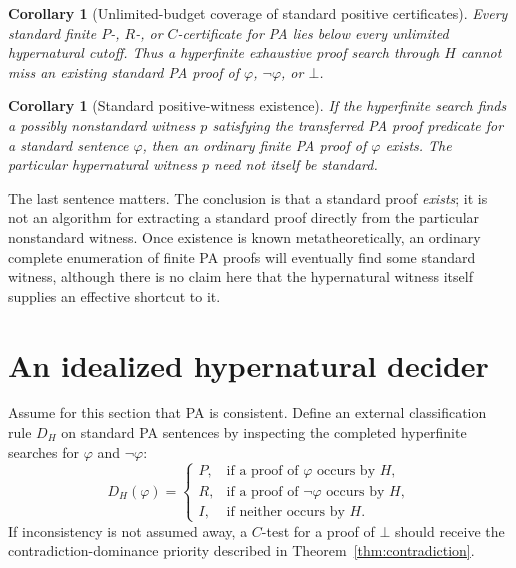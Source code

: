 \documentclass[11pt,openany]{book}
\newtheorem{corollary}[theorem]{Corollary}
\theoremstyle{definition}
\theoremstyle{remark}
\begin{document}
\begin{corollary}[Unlimited-budget coverage of standard positive certificates]\label{cor:hypercoverage}
Every standard finite $P$-, $R$-, or $C$-certificate for PA lies below every unlimited hypernatural cutoff. Thus a hyperfinite exhaustive proof search through $H$ cannot miss an existing standard PA proof of $\varphi$, $\neg\varphi$, or $\bot$.
\end{corollary}

\begin{corollary}[Standard positive-witness existence]\label{cor:positivehyperstandard}
If the hyperfinite search finds a possibly nonstandard witness $p$ satisfying the transferred PA proof predicate for a standard sentence $\varphi$, then an ordinary finite PA proof of $\varphi$ exists. The particular hypernatural witness $p$ need not itself be standard.
\end{corollary}

The last sentence matters. The conclusion is that a standard proof \emph{exists}; it is not an algorithm for extracting a standard proof directly from the particular nonstandard witness. Once existence is known metatheoretically, an ordinary complete enumeration of finite PA proofs will eventually find some standard witness, although there is no claim here that the hypernatural witness itself supplies an effective shortcut to it.

\section{An idealized hypernatural decider}
Assume for this section that PA is consistent. Define an external classification rule $D_H$ on standard PA sentences by inspecting the completed hyperfinite searches for $\varphi$ and $\neg\varphi$:
\[
D_H(\varphi)=
\begin{cases}
P,&\text{if a proof of }\varphi\text{ occurs by }H,\\
R,&\text{if a proof of }\neg\varphi\text{ occurs by }H,\\
I,&\text{if neither occurs by }H.
\end{cases}
\]
If inconsistency is not assumed away, a $C$-test for a proof of $\bot$ should receive the contradiction-dominance priority described in Theorem~\ref{thm:contradiction}.
\end{document}
